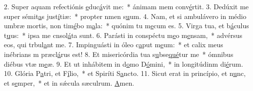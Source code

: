 2. Super aquam refectiónis \uline{e}duc\uline{á}vit me:~* ánimam mem conv\uline{é}rtit.
3. Dedúxit me super sémit\uline{a}s just\uline{í}tiæ:~* propter nmen s\uline{u}um.
4. Nam, et si ambulávero in médio umbræ mortis, non tim\uline{é}bo m\uline{a}la:~* quónim tu m\uline{e}cum es.
5. Virga tua, et b\uline{á}culus t\uline{u}us:~* ipsa me cnsol\uline{á}ta sunt.
6. Parásti in conspéctu m\uline{e}o m\uline{e}nsam,~* advérsus eos, qui trbul\uline{a}nt me.
7. Impinguásti in óleo c\uline{a}put m\uline{e}um:~* et calix meus inébrians m præcl\uline{á}rus est!
8. Et misericórdia tua s\uline{u}bse\uline{qué}tur me~* ómnibus diébus vtæ m\uline{e}æ.
9. Et ut inhábitem in d\uline{o}mo D\uline{ó}mini,~* in longitúdinm di\uline{é}rum.
10. Glória P\uline{a}tri, et F\uline{í}lio,~* et Spiríti S\uline{a}ncto.
11. Sicut erat in princípio, et n\uline{u}nc, et s\uline{e}mper,~* et in sǽcula sæculrum. \uline{A}men.
